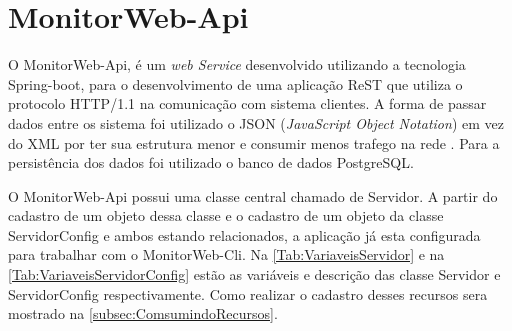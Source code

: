 
\section{MonitorWeb-Api}\label{sec:MonitorWeb-Api}

O MonitorWeb-Api, é um \textit{web Service} desenvolvido utilizando a tecnologia Spring-boot, para o desenvolvimento de uma aplicação ReST que utiliza o protocolo HTTP/1.1 na comunicação com sistema clientes. A forma de passar dados entre os sistema foi utilizado o JSON (\textit{JavaScript Object Notation}) em vez do XML por ter sua estrutura menor e consumir menos trafego na rede \cite{Saudate:2014}. Para a persistência dos dados foi utilizado o banco de dados PostgreSQL.

O MonitorWeb-Api possui uma classe central chamado de Servidor. A partir do cadastro de um objeto dessa classe e o cadastro de um objeto da classe ServidorConfig e ambos estando relacionados, a aplicação já esta configurada para trabalhar com o MonitorWeb-Cli. Na \autoref{Tab:VariaveisServidor} e na \autoref{Tab:VariaveisServidorConfig} estão as variáveis e descrição das classe Servidor e ServidorConfig respectivamente. Como realizar o cadastro desses recursos sera mostrado na \autoref{subsec:ComsumindoRecursos}. 


